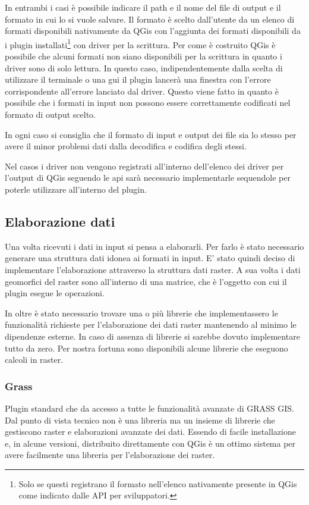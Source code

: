 In entrambi i casi è possibile indicare il path e il nome del file di output e il formato in cui lo si vuole salvare.
Il formato è scelto dall'utente da un elenco di formati disponibili nativamente da QGis con l'aggiunta dei formati disponibili da i plugin installati\footnote{Solo se questi registrano il formato nell'elenco nativamente presente in QGis come indicato dalle API per sviluppatori.} con driver per la scrittura. Per come è costruito QGis è possibile che alcuni formati non siano disponibili per la scrittura in quanto i driver sono di solo lettura. In questo caso, indipendentemente dalla scelta di utilizzare il terminale o una gui il plugin lancerà una finestra con l'errore corrispondente all'errore lanciato dal driver. Questo viene fatto in quanto è possibile che i formati in input non possono essere correttamente codificati nel formato di output scelto.

In ogni caso si consiglia che il formato di input e output dei file sia lo stesso per avere il minor problemi dati dalla decodifica e codifica degli stessi.

Nel casos i driver non vengono registrati all'interno dell'elenco dei driver per l'output di QGis seguendo le api sarà necessario implementarle sequendole per poterle utilizzare all'interno del plugin.

\subsection{Elaborazione dati}
Una volta ricevuti i dati in input si pensa a elaborarli. Per farlo è stato necessario generare una struttura dati idonea ai formati in input. E' stato quindi deciso di implementare l'elaborazione attraverso la struttura dati raster. A sua volta i dati geomorfici del raster sono all'interno di una matrice, che è l'oggetto con cui il plugin esegue le operazioni.

In oltre è stato necessario trovare una o più librerie che implementassero le funzionalità richieste per l'elaborazione dei dati raster mantenendo al minimo le dipendenze esterne. In caso di assenza di librerie si sarebbe dovuto implementare tutto da zero. Per nostra fortuna sono disponibili alcune librerie che eseguono calcoli in raster.

\subsubsection{Grass}
Plugin standard che da accesso a tutte le funzionalità avanzate di GRASS GIS. Dal punto di vista tecnico non è una libreria ma un insieme di librerie che gestiscono raster e elaborazioni avanzate dei dati. Essendo di facile installazione e, in alcune versioni, distribuito direttamente con QGis è un ottimo sistema per avere facilmente una libreria per l'elaborazione dei raster.

